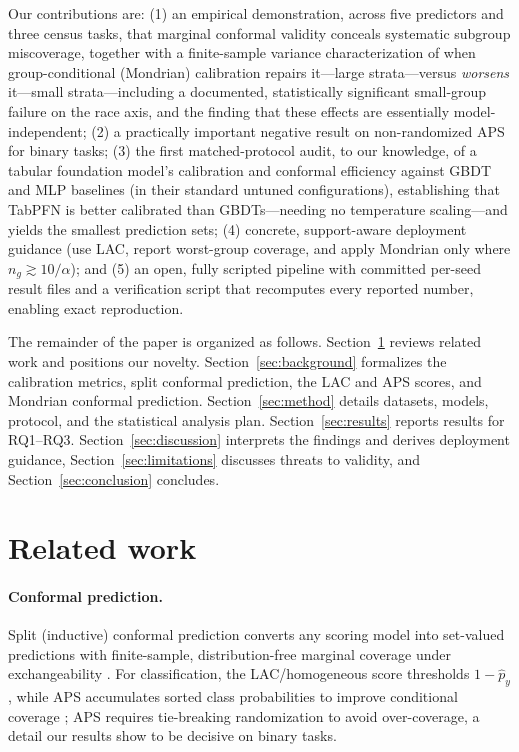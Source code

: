 \documentclass[review,12pt]{elsarticle}
\begin{document}
\noindent Our contributions are: (1) an empirical demonstration, across five predictors and three census tasks, that marginal conformal validity conceals systematic subgroup miscoverage, together with a finite-sample variance characterization of when group-conditional (Mondrian) calibration repairs it---large strata---versus \emph{worsens} it---small strata---including a documented, statistically significant small-group failure on the race axis, and the finding that these effects are essentially model-independent; (2) a practically important negative result on non-randomized APS for binary tasks; (3) the first matched-protocol audit, to our knowledge, of a tabular foundation model's calibration and conformal efficiency against GBDT and MLP baselines (in their standard untuned configurations), establishing that TabPFN is better calibrated than GBDTs---needing no temperature scaling---and yields the smallest prediction sets; (4) concrete, support-aware deployment guidance (use LAC, report worst-group coverage, and apply Mondrian only where $n_g \gtrsim 10/\alpha$); and (5) an open, fully scripted pipeline with committed per-seed result files and a verification script that recomputes every reported number, enabling exact reproduction.

The remainder of the paper is organized as follows. Section~\ref{sec:related} reviews related work and positions our novelty. Section~\ref{sec:background} formalizes the calibration metrics, split conformal prediction, the LAC and APS scores, and Mondrian conformal prediction. Section~\ref{sec:method} details datasets, models, protocol, and the statistical analysis plan. Section~\ref{sec:results} reports results for RQ1--RQ3. Section~\ref{sec:discussion} interprets the findings and derives deployment guidance, Section~\ref{sec:limitations} discusses threats to validity, and Section~\ref{sec:conclusion} concludes.

\section{Related work}
\label{sec:related}

\paragraph{Conformal prediction.}
Split (inductive) conformal prediction converts any scoring model into set-valued predictions with finite-sample, distribution-free marginal coverage under exchangeability \cite{vovk2005,papadopoulos2002,angelopoulos2023}. For classification, the LAC/homogeneous score thresholds $1-\hat p_y$ \cite{sadinle2019}, while APS accumulates sorted class probabilities to improve conditional coverage \cite{romano2020aps}; APS requires tie-breaking randomization to avoid over-coverage, a detail our results show to be decisive on binary tasks.
\end{document}
